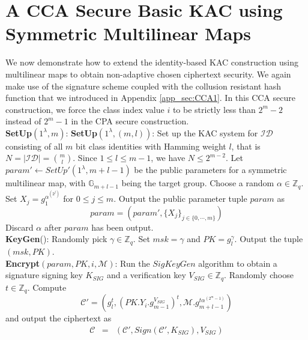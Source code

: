 \section{A CCA Secure Basic KAC using Symmetric Multilinear Maps}
\label{app_sec:CCAsecure2}

We now demonstrate how to extend the identity-based KAC construction using multilinear maps to obtain non-adaptive chosen ciphertext security. We again make use of the signature scheme coupled with the collusion resistant hash function that we introduced in Appendix \ref{app_sec:CCA1}. In this CCA secure construction, we force the class index value $i$ to be strictly less than $2^m-2$ instead of $2^m-1$ in the CPA secure construction.\\

\noindent\textbf{SetUp}$(1^{\lambda},m)$: \noindent\textbf{SetUp}$(1^{\lambda},(m,l))$: Set up the KAC system for $\mathcal{ID}$ consisting of all $m$ bit class identities with Hamming weight $l$, that is $N=|\mathcal{ID}|=\binom{m}{l}$. Since $1\leq l\leq m-1$, we have $N\leq 2^{m-2}$. Let $param'\leftarrow SetUp'(1^{\lambda},m+l-1)$ be the public parameters for a symmetric multilinear map, with $\mathbb{G}_{m+l-1}$ being the target group. Choose a random $\alpha\in \mathbb{Z}_q$. Set $X_j=g^{\alpha^{(2^j)}}_{1}$ for $0\leq j\leq m$.  Output the public parameter tuple $param$ as
\begin{equation}
 param = (param',\{X_j\}_{j\in\{0,\cdots,m\}})\nonumber
\end{equation}
\noindent Discard $\alpha$ after $param$ has been output.\\
 
\noindent \textbf{KeyGen}(): Randomly pick $\gamma\in \mathbb{Z}_q$. Set $msk=\gamma$ and $PK=g^{\gamma}_{l}$. Output the tuple $(msk,PK)$.\\
 
\noindent \textbf{Encrypt}$(param,PK,i,\mathcal{M})$: Run the $SigKeyGen$ algorithm to obtain a signature signing key $K_{SIG}$ and a verification key $V_{SIG} \in \mathbb{Z}_q$. Randomly choose $t\in\mathbb{Z}_q$. Compute 
\begin{equation}
 \mathcal{C}'=(g^{t}_{l},(PK.Y_i.g^{V_{SIG}}_{m-1})^{t},\mathcal{M}.g^{t\alpha^{(2^m-1)}}_{m+l-1})\nonumber
\end{equation} 
\noindent and output the ciphertext as
\begin{eqnarray}
 \mathcal{C}&=&(\mathcal{C}',Sign(\mathcal{C}',K_{SIG}),V_{SIG}) \nonumber
\end{eqnarray} 
 
